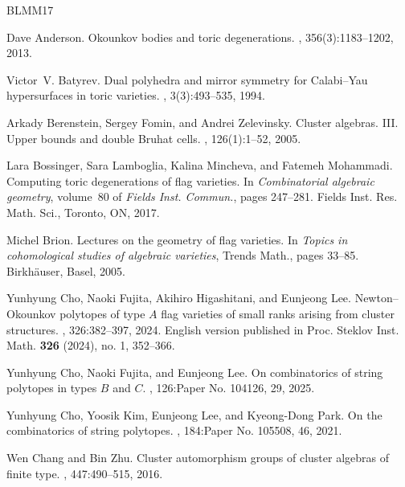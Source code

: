 \documentclass[10pt]{amsart}
\numberwithin{equation}{section}
\theoremstyle{plain}
\theoremstyle{definition}
\theoremstyle{remark}
\begin{document}
%
%
\begin{thebibliography}{BLMM17}
	
	Dave Anderson.
	\newblock Okounkov bodies and toric degenerations.
	, 356(3):1183--1202, 2013.
	
	Victor~V. Batyrev.
	\newblock Dual polyhedra and mirror symmetry for {C}alabi--{Y}au hypersurfaces
	in toric varieties.
	, 3(3):493--535, 1994.
	
	Arkady Berenstein, Sergey Fomin, and Andrei Zelevinsky.
	\newblock Cluster algebras. {III}. {U}pper bounds and double {B}ruhat cells.
	, 126(1):1--52, 2005.
	
	Lara Bossinger, Sara Lamboglia, Kalina Mincheva, and Fatemeh Mohammadi.
	\newblock Computing toric degenerations of flag varieties.
	\newblock In {\em Combinatorial algebraic geometry}, volume~80 of {\em Fields
		Inst. Commun.}, pages 247--281. Fields Inst. Res. Math. Sci., Toronto, ON,
	2017.
	
	Michel Brion.
	\newblock Lectures on the geometry of flag varieties.
	\newblock In {\em Topics in cohomological studies of algebraic varieties},
	Trends Math., pages 33--85. Birkh\"auser, Basel, 2005.
	
	Yunhyung Cho, Naoki Fujita, Akihiro Higashitani, and Eunjeong Lee.
	\newblock Newton--{O}kounkov polytopes of type {$A$} flag varieties of small
	ranks arising from cluster structures.
	, 326:382--397, 2024.
	\newblock English version published in Proc. Steklov Inst. Math. {\bf 326}
	(2024), no. 1, 352--366.
	
	Yunhyung Cho, Naoki Fujita, and Eunjeong Lee.
	\newblock On combinatorics of string polytopes in types {$B$} and {$C$}.
	, 126:Paper No. 104126, 29, 2025.
	
	Yunhyung Cho, Yoosik Kim, Eunjeong Lee, and Kyeong-Dong Park.
	\newblock On the combinatorics of string polytopes.
	, 184:Paper No. 105508, 46, 2021.
	
	Wen Chang and Bin Zhu.
	\newblock Cluster automorphism groups of cluster algebras of finite type.
	, 447:490--515, 2016.
	

\end{thebibliography}
\end{document}
